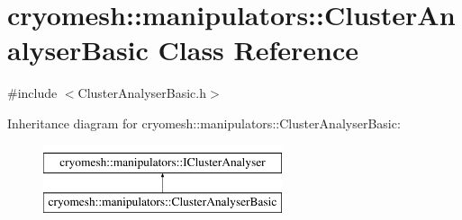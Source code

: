 \hypertarget{classcryomesh_1_1manipulators_1_1ClusterAnalyserBasic}{\section{cryomesh\-:\-:manipulators\-:\-:\-Cluster\-Analyser\-Basic \-Class \-Reference}
\label{classcryomesh_1_1manipulators_1_1ClusterAnalyserBasic}
}


{\ttfamily \#include $<$\-Cluster\-Analyser\-Basic.\-h$>$}

\-Inheritance diagram for cryomesh\-:\-:manipulators\-:\-:\-Cluster\-Analyser\-Basic\-:\begin{figure}[H]
\begin{center}
\leavevmode
\includegraphics[height=2.000000cm]{classcryomesh_1_1manipulators_1_1ClusterAnalyserBasic}
\end{center}
\end{figure}
